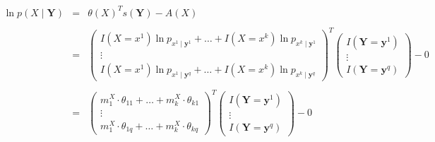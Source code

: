 \documentclass[11pt, oneside]{article}   	%
\numberwithin{figure}{section}
\numberwithin{equation}{section}
\numberwithin{table}{section}
\begin{document}
\begin{itemize}
\begin{eqnarray*}
\ln p(X\mid \mathbf{Y}) &=& \theta(X)^T s(\mathbf{Y}) - A(X) \\ \\
&=&
\begin{pmatrix}
I(X=x^1)  \ln p_{x^1\mid \mathbf{y}^1}  + \ldots + I(X=x^k)  \ln p_{x^k\mid \mathbf{y}^1} \\
\vdots \\
I(X=x^1)  \ln p_{x^1\mid \mathbf{y}^q}  + \ldots + I(X=x^k)  \ln p_{x^k\mid \mathbf{y}^q}
\end{pmatrix}^T
\begin{pmatrix}
I(\mathbf{Y}=\mathbf{y}^1) \\
\vdots \\
I(\mathbf{Y}=\mathbf{y}^q)
\end{pmatrix}
- 0\\ \\
&=&
\begin{pmatrix}
m^X_1 \cdot \theta_{11}  +  \ldots + m^X_k \cdot \theta_{k1}\\
\vdots \\
m^X_1 \cdot \theta_{1q}   + \ldots + m^X_k \cdot \theta_{kq}
\end{pmatrix}^T
\begin{pmatrix}
I(\mathbf{Y}=\mathbf{y}^1) \\
\vdots \\
I(\mathbf{Y}=\mathbf{y}^q)
\end{pmatrix}
- 0
\end{eqnarray*}



\end{itemize}
\end{document}
